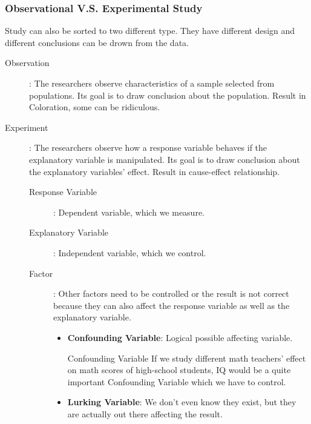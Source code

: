 \subsubsection{Observational V.S. Experimental Study}
Study can also be sorted to two different type. They have different design and different conclusions can be drown from the data. 
\begin{description}
    \item[Observation]: The researchers observe characteristics of a sample selected from populations. Its goal is to draw conclusion about the population. Result in Coloration, some can be ridiculous.
  
    \item[Experiment]: The researchers observe how a response variable behaves if the explanatory variable is manipulated. Its goal is to draw conclusion about the explanatory variables' effect. Result in cause-effect relationship.
    \begin{description}
    \item[Response Variable]: Dependent variable, which we measure.
    \item[Explanatory Variable]: Independent variable, which we control.
    \item[Factor]: Other factors need to be controlled or the result is not correct because they can also affect the response variable as well as the explanatory variable.   
    \begin{itemize}
        \item \textbf{Confounding Variable}: Logical possible affecting variable.\\
  \begin{examplebox}{Confounding Variable}
  If we study different math teachers' effect on math scores of high-school students, IQ would be a quite important Confounding Variable which we have to control.  
  \end{examplebox}
   
  \item \textbf{Lurking Variable}: We don't even know they exist, but they are actually out there affecting the result.
    \end{itemize}
    \end{description}
    \end{description}
    


